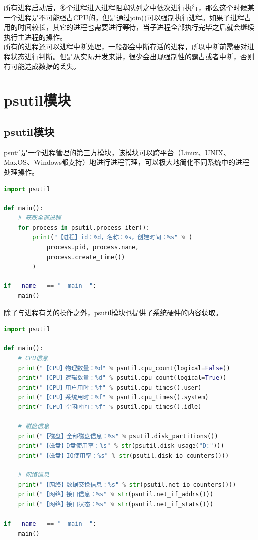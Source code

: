 所有进程启动后，多个进程进入进程阻塞队列之中依次进行执行，那么这个时候某一个进程是不可能强占CPU的，但是通过join()可以强制执行进程。如果子进程占用的时间较长，其它的进程也需要进行等待，当子进程全部执行完毕之后就会继续执行主进程的操作。\\

所有的进程还可以进程中断处理，一般都会中断存活的进程，所以中断前需要对进程状态进行判断。但是从实际开发来讲，很少会出现强制性的霸占或者中断，否则有可能造成数据的丢失。

\newpage

\section{psutil模块}

\subsection{psutil模块}

psutil是一个进程管理的第三方模块，该模块可以跨平台（Linux、UNIX、MaxOS、Windows都支持）地进行进程管理，可以极大地简化不同系统中的进程处理操作。\\


\begin{lstlisting}[language=Python]
import psutil

def main():
	# 获取全部进程
	for process in psutil.process_iter():
		print("【进程】id：%d，名称：%s，创建时间：%s" % (
			process.pid, process.name,
			process.create_time())
		)

if __name__ == "__main__":
	main()
\end{lstlisting}

除了与进程有关的操作之外，psutil模块也提供了系统硬件的内容获取。\\


\begin{lstlisting}[language=Python]
import psutil

def main():
    # CPU信息
    print("【CPU】物理数量：%d" % psutil.cpu_count(logical=False))
    print("【CPU】逻辑数量：%d" % psutil.cpu_count(logical=True))
    print("【CPU】用户用时：%f" % psutil.cpu_times().user)
    print("【CPU】系统用时：%f" % psutil.cpu_times().system)
    print("【CPU】空闲时间：%f" % psutil.cpu_times().idle)

    # 磁盘信息
    print("【磁盘】全部磁盘信息：%s" % psutil.disk_partitions())
    print("【磁盘】D盘使用率：%s" % str(psutil.disk_usage("D:")))
    print("【磁盘】IO使用率：%s" % str(psutil.disk_io_counters()))

    # 网络信息
    print("【网络】数据交换信息：%s" % str(psutil.net_io_counters()))
    print("【网络】接口信息：%s" % str(psutil.net_if_addrs()))
    print("【网络】接口状态：%s" % str(psutil.net_if_stats()))

if __name__ == "__main__":
    main()
\end{lstlisting}

